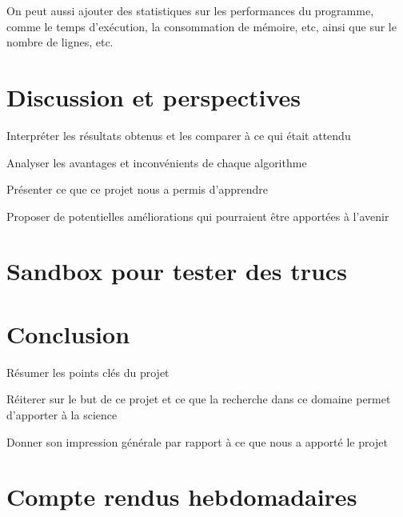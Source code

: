 \documentclass[12pt]{scrreprt} %
\begin{document}
On peut aussi ajouter des statistiques sur les performances du programme, comme le temps d'exécution, la consommation de mémoire, etc, ainsi que sur le nombre de lignes, etc.

\chapter{Discussion et perspectives}

Interpréter les résultats obtenus et les comparer à ce qui était attendu

Analyser les avantages et inconvénients de chaque algorithme

Présenter ce que ce projet nous a permis d'apprendre

Proposer de potentielles améliorations qui pourraient être apportées à l'avenir



\chapter{Sandbox pour tester des trucs}


\chapter*{Conclusion}

Résumer les points clés du projet

Réiterer sur le but de ce projet et ce que la recherche dans ce domaine permet d'apporter à la science

Donner son impression générale par rapport à ce que nous a apporté le projet

\newpage %
\renewcommand{\bibname}{Bibliographie} %


\chapter*{Compte rendus hebdomadaires}
\end{document}
